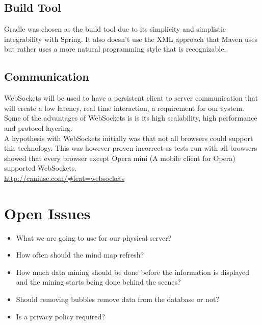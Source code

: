 \documentclass[hidelinks,english]{article}
\begin{document}
		\subsection{Build Tool}
			Gradle was chosen as the build tool due to its simplicity and simplistic integrability with Spring. It also doesn't use the XML approach that Maven uses but rather uses a more natural programming style that is recognizable.
			
		\subsection{Communication}
			WebSockets will be used to have a persistent client to server communication that will create a low latency, real time interaction, a requirement for our system. Some of the advantages of WebSockets is is its high scalability, high performance and protocol layering.\\
			A hypothesis with WebSockets initially was that not all browsers could support this technology. This was however proven incorrect as tests run with all browsers showed that every browser except Opera mini (A mobile client for Opera) supported WebSockets. \\
			\sloppy\url{http://caniuse.com/\#feat=websockets}
	
	\section{Open Issues}
		\begin{itemize}
			\item What we are going to use for our physical server?
			\item How often should the mind map refresh?
			\item How much data mining should be done before the information is displayed and the mining starts being done behind the scenes?
			\item Should removing bubbles remove data from the database or not?
			\item Is a privacy policy required?
		\end{itemize}
\end{document}
